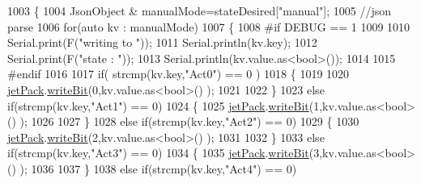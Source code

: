 \begin{DoxyCode}
1003             \{ 
1004                 JsonObject & manualMode=stateDesired[\textcolor{stringliteral}{"manual"}];
1005                 \textcolor{comment}{//json parse}
1006                 \textcolor{keywordflow}{for}(\textcolor{keyword}{auto} kv : manualMode)
1007                 \{
1008 \textcolor{preprocessor}{                #if DEBUG == 1}
1009 
1010                     Serial.print(F(\textcolor{stringliteral}{"writing to "}));
1011                     Serial.println(kv.key);
1012                     Serial.print(F(\textcolor{stringliteral}{"state : "}));
1013                     Serial.println(kv.value.as<\textcolor{keywordtype}{bool}>());        
1014                     
1015 \textcolor{preprocessor}{                #endif              }
1016 
1017                     \textcolor{keywordflow}{if}( strcmp(kv.key,\textcolor{stringliteral}{"Act0"}) == 0 )
1018                     \{
1019                     
1020                         \hyperlink{class_cool_board_a30b1357881b01ccbec676856a91e48e9}{jetPack}.\hyperlink{class_jetpack_a79ae7bc3c1828a0551a7c005c4f8bd00}{writeBit}(0,kv.value.as<\textcolor{keywordtype}{bool}>() ); 
1021                         
1022                     \}
1023                     \textcolor{keywordflow}{else} \textcolor{keywordflow}{if}(strcmp(kv.key,\textcolor{stringliteral}{"Act1"}) == 0)
1024                     \{
1025                         \hyperlink{class_cool_board_a30b1357881b01ccbec676856a91e48e9}{jetPack}.\hyperlink{class_jetpack_a79ae7bc3c1828a0551a7c005c4f8bd00}{writeBit}(1,kv.value.as<\textcolor{keywordtype}{bool}>() ); 
1026 
1027                     \}
1028                     \textcolor{keywordflow}{else} \textcolor{keywordflow}{if}(strcmp(kv.key,\textcolor{stringliteral}{"Act2"}) == 0)
1029                     \{
1030                         \hyperlink{class_cool_board_a30b1357881b01ccbec676856a91e48e9}{jetPack}.\hyperlink{class_jetpack_a79ae7bc3c1828a0551a7c005c4f8bd00}{writeBit}(2,kv.value.as<\textcolor{keywordtype}{bool}>() ); 
1031 
1032                     \}
1033                     \textcolor{keywordflow}{else} \textcolor{keywordflow}{if}(strcmp(kv.key,\textcolor{stringliteral}{"Act3"}) == 0)
1034                     \{
1035                         \hyperlink{class_cool_board_a30b1357881b01ccbec676856a91e48e9}{jetPack}.\hyperlink{class_jetpack_a79ae7bc3c1828a0551a7c005c4f8bd00}{writeBit}(3,kv.value.as<\textcolor{keywordtype}{bool}>() ); 
1036 
1037                     \}
1038                     \textcolor{keywordflow}{else} \textcolor{keywordflow}{if}(strcmp(kv.key,\textcolor{stringliteral}{"Act4"}) == 0)

\end{DoxyCode}
